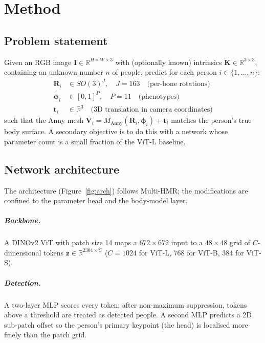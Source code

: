 \chapter{Method}
\label{ch:method}

\section{Problem statement}

Given an RGB image $\mathbf{I}\in\mathbb{R}^{H\times W\times 3}$ with (optionally
known) intrinsics $\mathbf{K}\in\mathbb{R}^{3\times3}$, containing an unknown
number $n$ of people, predict for each person $i\in\{1,\dots,n\}$:
\begin{align}
  \mathbf{R}_i &\in SO(3)^{J},\quad J=163 \quad\text{(per-bone rotations)}\\
  \boldsymbol{\phi}_i &\in [0,1]^{P},\quad P=11 \quad\text{(phenotypes)}\\
  \mathbf{t}_i &\in \mathbb{R}^3 \quad\text{(3D translation in camera coordinates)}
\end{align}
such that the Anny mesh
$\mathbf{V}_i = M_{\text{Anny}}(\mathbf{R}_i,\boldsymbol{\phi}_i) + \mathbf{t}_i$
matches the person's true body surface. A secondary objective is to do this with
a network whose parameter count is a small fraction of the ViT-L baseline.

\section{Network architecture}
\label{sec:arch}

The architecture (Figure~\ref{fig:arch}) follows Multi-HMR; the modifications
are confined to the parameter head and the body-model layer.

\paragraph{Backbone.} A DINOv2 ViT with patch size 14 maps a
$672{\times}672$ input to a $48{\times}48$ grid of $C$-dimensional tokens
$\mathbf{z}\in\mathbb{R}^{2304\times C}$ ($C{=}1024$ for ViT-L, 768 for ViT-B,
384 for ViT-S).

\paragraph{Detection.} A two-layer MLP scores every token; after non-maximum
suppression, tokens above a threshold are treated as detected people. A second
MLP predicts a 2D sub-patch offset so the person's primary keypoint (the head)
is localised more finely than the patch grid.

